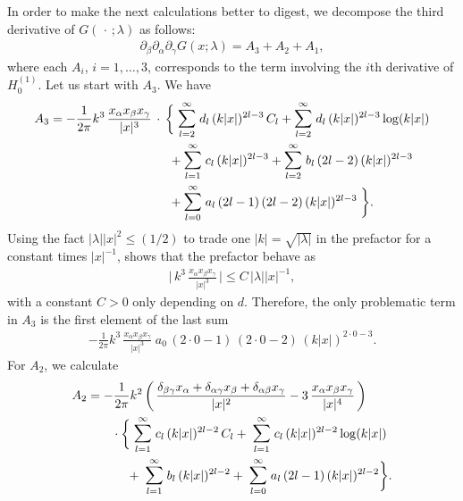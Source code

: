 In order to make the next calculations better to digest, we decompose the third derivative of $G(\,\cdot\, ; \lambda)$ as follows:
\begin{align*}
  \partial_\beta \partial_\alpha \partial_\gamma G(x; \lambda)
  = A_3 + A_2 + A_1,
\end{align*}
where each $A_i$, $i = 1,\dots,3$, corresponds to the term involving the $i$th derivative of $H_0^{(1)}$.
Let us start with $A_3$. 
We have
\begin{align*}
  A_3 = - \frac{1}{2 \pi } k^3 \, \frac{x_\alpha x_\beta x_\gamma}{|x|^3}  \,
  &\cdot\,\bigg\{
     \; \mathlarger{\sum}_{l = 2}^\infty \; d_l \, (k|x|)^{2l - 3} \, C_l +  \mathlarger{\sum}_{l = 2}^\infty \; d_l \, (k|x|)^{2l - 3} \log(k|x|)  \\
  &\quad\,  +  \mathlarger{\sum}_{l = 1}^\infty \; c_l \, (k|x|)^{2l - 3} +  \mathlarger{\sum}_{l = 2}^\infty \; b_l\, (2l - 2) \, (k|x|)^{2l - 3} \\
  &\quad\, +  \mathlarger{\sum}_{l = 0}^\infty \; a_l \, (2l - 1)\, (2l - 2) \, (k|x|)^{2l - 3} \;
  \bigg\}.
\end{align*}
Using the fact $|\lambda| |x|^2 \leq (1/2)$ to trade one $|k| = \sqrt{|\lambda|}$ in the prefactor for a constant times $|x|^{-1}$, shows that the prefactor behave as
\begin{align*}
  \Big|\, k^3 \, \frac{x_\alpha x_\beta x_\gamma}{|x|^3}\, \Big| 
  \leq C\, |\lambda| |x|^{-1}, 
\end{align*}
with a constant $C > 0$ only depending on $d$.
Therefore, the only problematic term in $A_3$ is the first element of the last sum
\begin{align}
  \label{eq:P1}
  \tag{P1}- \frac{1}{2 \pi } k^3\, \frac{x_\alpha x_\beta x_\gamma}{|x|^3}   \; a_0 \, (2 \cdot 0 - 1)\, (2 \cdot 0 - 2) \, (k|x|)^{2 \cdot 0 - 3} .
\end{align}
For $A_2$, we calculate
\begin{align*}
  A_2 &= - \frac{1}{2\pi} k^2\, \bigg(\, \frac{\delta_{\beta\gamma} x_\alpha + \delta_{\alpha \gamma} x_\beta + \delta_{\alpha \beta} x_\gamma}{|x|^2} - 3\, \frac{x_\alpha x_\beta x_\gamma}{|x|^4} \, \bigg) \\ 
  &\qquad \cdot 
  \bigg\{
    \; \mathlarger{\sum}_{l = 1}^\infty \; c_l \, (k|x|)^{2l - 2} \, C_l 
  + \; \mathlarger{\sum}_{l = 1}^\infty \; c_l \, (k|x|)^{2l - 2} \log(k|x|) \\
  &\qquad\quad\,+ \; \mathlarger{\sum}_{l = 1}^\infty \; b_l \, (k|x|)^{2l - 2} 
  + \; \mathlarger{\sum}_{l = 0}^\infty \; a_l\, (2l - 1) \, (k|x|)^{2l - 2} 
  \bigg\}.
\end{align*}
